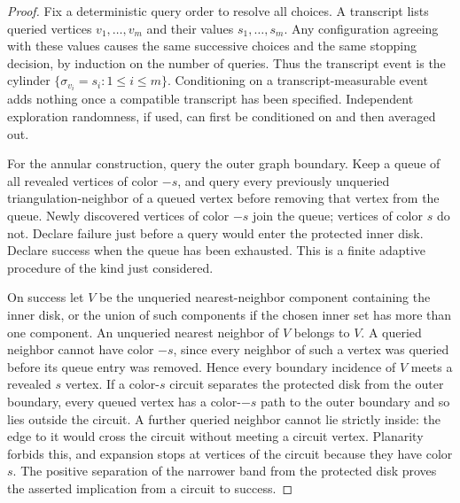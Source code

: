 \begin{proof}
Fix a deterministic query order to resolve all choices.  A transcript
lists queried vertices \(v_1,\ldots,v_m\) and their values
\(s_1,\ldots,s_m\).  Any configuration agreeing with these values causes
the same successive choices and the same stopping decision, by induction
on the number of queries.  Thus the transcript event is the cylinder
\(\{\sigma_{v_i}=s_i:1\le i\le m\}\).  Conditioning on a
transcript-measurable event adds nothing once a compatible transcript
has been specified.  Independent exploration randomness, if used, can
first be conditioned on and then averaged out.

For the annular construction, query the outer graph boundary.  Keep a
queue of all revealed vertices of color \(-s\), and query every
previously unqueried triangulation-neighbor of a queued vertex before
removing that vertex from the queue.  Newly discovered vertices of color
\(-s\) join the queue; vertices of color \(s\) do not.  Declare failure
just before a query would enter the protected inner disk.  Declare
success when the queue has been exhausted.  This is a finite adaptive
procedure of the kind just considered.

On success let \(V\) be the unqueried nearest-neighbor component
containing the inner disk, or the union of such components if the chosen
inner set has more than one component.  An unqueried nearest neighbor
of \(V\) belongs to \(V\).  A queried neighbor cannot have color \(-s\),
since every neighbor of such a vertex was queried before its queue entry
was removed.  Hence every boundary incidence of \(V\) meets a revealed
\(s\) vertex.  If a color-\(s\) circuit separates the protected disk from
the outer boundary, every queued vertex has a color-\(-s\) path to the
outer boundary and so lies outside the circuit.  A further queried
neighbor cannot lie strictly inside: the edge to it would cross the
circuit without meeting a circuit vertex.  Planarity forbids this, and
expansion stops at vertices of the circuit because they have color
\(s\).  The positive separation of the narrower band from the protected
disk proves the asserted implication from a circuit to success.


\end{proof}
